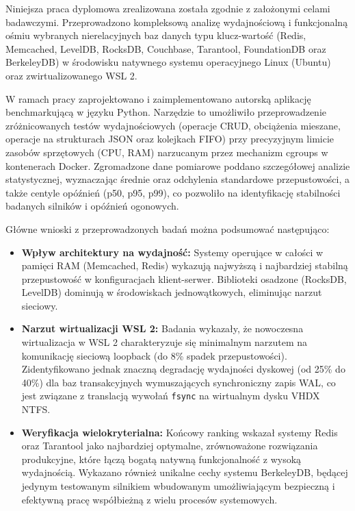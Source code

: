 Niniejsza praca dyplomowa zrealizowana została zgodnie z założonymi celami badawczymi. Przeprowadzono kompleksową analizę wydajnościową i funkcjonalną ośmiu wybranych nierelacyjnych baz danych typu klucz-wartość (Redis, Memcached, LevelDB, RocksDB, Couchbase, Tarantool, FoundationDB oraz BerkeleyDB) w środowisku natywnego systemu operacyjnego Linux (Ubuntu) oraz zwirtualizowanego WSL 2.

W ramach pracy zaprojektowano i zaimplementowano autorską aplikację benchmarkującą w języku Python. Narzędzie to umożliwiło przeprowadzenie zróżnicowanych testów wydajnościowych (operacje CRUD, obciążenia mieszane, operacje na strukturach JSON oraz kolejkach FIFO) przy precyzyjnym limicie zasobów sprzętowych (CPU, RAM) narzucanym przez mechanizm cgroups w kontenerach Docker. Zgromadzone dane pomiarowe poddano szczegółowej analizie statystycznej, wyznaczając średnie oraz odchylenia standardowe przepustowości, a także centyle opóźnień (p50, p95, p99), co pozwoliło na identyfikację stabilności badanych silników i opóźnień ogonowych.

Główne wnioski z przeprowadzonych badań można podsumować następująco:
\begin{itemize}
    \item \textbf{Wpływ architektury na wydajność:} Systemy operujące w całości w pamięci RAM (Memcached, Redis) wykazują najwyższą i najbardziej stabilną przepustowość w konfiguracjach klient-serwer. Biblioteki osadzone (RocksDB, LevelDB) dominują w środowiskach jednowątkowych, eliminując narzut sieciowy.
    \item \textbf{Narzut wirtualizacji WSL 2:} Badania wykazały, że nowoczesna wirtualizacja w WSL 2 charakteryzuje się minimalnym narzutem na komunikację sieciową loopback (do 8\% spadek przepustowości). Zidentyfikowano jednak znaczną degradację wydajności dyskowej (od 25\% do 40\%) dla baz transakcyjnych wymuszających synchroniczny zapis WAL, co jest związane z translacją wywołań \texttt{fsync} na wirtualnym dysku VHDX NTFS.
    \item \textbf{Weryfikacja wielokryterialna:} Końcowy ranking wskazał systemy Redis oraz Tarantool jako najbardziej optymalne, zrównoważone rozwiązania produkcyjne, które łączą bogatą natywną funkcjonalność z wysoką wydajnością. Wykazano również unikalne cechy systemu BerkeleyDB, będącej jedynym testowanym silnikiem wbudowanym umożliwiającym bezpieczną i efektywną pracę współbieżną z wielu procesów systemowych.
\end{itemize}

